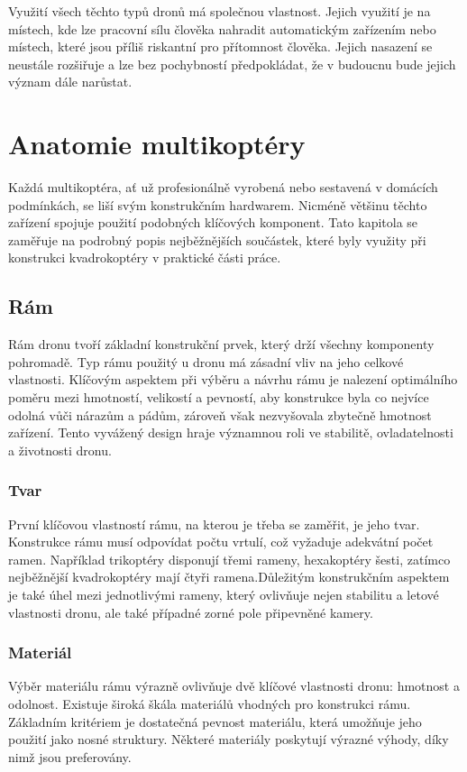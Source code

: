 \documentclass[12pt]{report}
\begin{document}
Využití všech těchto typů dronů má společnou vlastnost. Jejich využití je na místech, kde lze pracovní sílu člověka nahradit automatickým zařízením nebo místech, které jsou příliš riskantní pro přítomnost člověka. Jejich nasazení se neustále rozšiřuje a lze bez pochybností předpokládat, že v budoucnu bude jejich význam dále narůstat.

\chapter[Anatomie multikoptéry]{Anatomie multikoptéry}
Každá multikoptéra, ať už profesionálně vyrobená nebo sestavená v domácích podmínkách, se liší svým konstrukčním hardwarem. Nicméně většinu těchto zařízení spojuje použití podobných klíčových komponent. Tato kapitola se zaměřuje na podrobný popis nejběžnějších součástek, které byly využity při konstrukci kvadrokoptéry v praktické části práce.

\section{Rám}
Rám dronu tvoří základní konstrukční prvek, který drží všechny komponenty pohromadě. Typ rámu použitý u dronu má zásadní vliv na jeho celkové vlastnosti. Klíčovým aspektem při výběru a návrhu rámu je nalezení optimálního poměru mezi hmotností, velikostí a pevností, aby konstrukce byla co nejvíce odolná vůči nárazům a pádům, zároveň však nezvyšovala zbytečně hmotnost zařízení. Tento vyvážený design hraje významnou roli ve stabilitě, ovladatelnosti a životnosti dronu.

\subsection{Tvar}
První klíčovou vlastností rámu, na kterou je třeba se zaměřit, je jeho tvar. Konstrukce rámu musí odpovídat počtu vrtulí, což vyžaduje adekvátní počet ramen. Například trikoptéry disponují třemi rameny, hexakoptéry šesti, zatímco nejběžnější kvadrokoptéry mají čtyři ramena.Důležitým konstrukčním aspektem je také úhel mezi jednotlivými rameny, který ovlivňuje nejen stabilitu a letové vlastnosti dronu, ale také případné zorné pole připevněné kamery.

\subsection{Materiál}
Výběr materiálu rámu výrazně ovlivňuje dvě klíčové vlastnosti dronu: hmotnost a odolnost. Existuje široká škála materiálů vhodných pro konstrukci rámu. Základním kritériem je dostatečná pevnost materiálu, která umožňuje jeho použití jako nosné struktury. Některé materiály poskytují výrazné výhody, díky nimž jsou preferovány.\\
\end{document}
